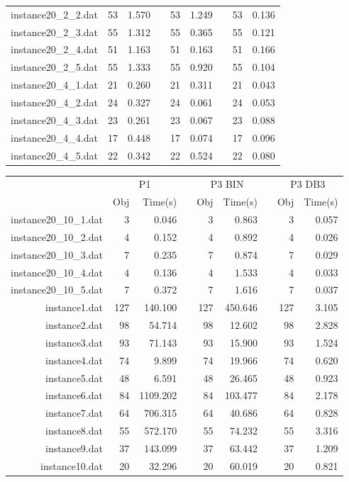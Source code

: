 \begin{table}[h!]
\begin{tabular}{@{}rrrcrrcrr@{}}
instance20\_2\_2.dat & 53 & 1.570 & & 53 & 1.249 & & 53 & 0.136 \\
instance20\_2\_3.dat & 55 & 1.312 & & 55 & 0.365 & & 55 & 0.121 \\
instance20\_2\_4.dat & 51 & 1.163 & & 51 & 0.163 & & 51 & 0.166 \\
instance20\_2\_5.dat & 55 & 1.333 & & 55 & 0.920 & & 55 & 0.104 \\
instance20\_4\_1.dat & 21 & 0.260 & & 21 & 0.311 & & 21 & 0.043 \\
instance20\_4\_2.dat & 24 & 0.327 & & 24 & 0.061 & & 24 & 0.053 \\
instance20\_4\_3.dat & 23 & 0.261 & & 23 & 0.067 & & 23 & 0.088 \\
instance20\_4\_4.dat & 17 & 0.448 & & 17 & 0.074 & & 17 & 0.096 \\
instance20\_4\_5.dat & 22 & 0.342 & & 22 & 0.524 & & 22 & 0.080 \\
\end{tabular}
\end{table}
\newpage
\begin{table}[h!]\centering
{}
\begin{tabular}{@{}rrrcrrcrr@{}}\toprule
& \multicolumn{2}{c}{P1} & \phantom{abc} & \multicolumn{2}{c}{P3 BIN} & \phantom{abc} & \multicolumn{2}{c}{P3 DB3}\\
\cmidrule{2-3} \cmidrule{5-6} \cmidrule{8-9}
& Obj & Time(s) & & Obj & Time(s) & & Obj & Time(s)\\ \midrule
instance20\_10\_1.dat & 3 & 0.046 & & 3 & 0.863 & & 3 & 0.057 \\
instance20\_10\_2.dat & 4 & 0.152 & & 4 & 0.892 & & 4 & 0.026 \\
instance20\_10\_3.dat & 7 & 0.235 & & 7 & 0.874 & & 7 & 0.029 \\
instance20\_10\_4.dat & 4 & 0.136 & & 4 & 1.533 & & 4 & 0.033 \\
instance20\_10\_5.dat & 7 & 0.372 & & 7 & 1.616 & & 7 & 0.037 \\
instance1.dat & 127 & 140.100 & & 127 & 450.646 & & 127 & 3.105 \\
instance2.dat & 98 & 54.714 & & 98 & 12.602 & & 98 & 2.828 \\
instance3.dat & 93 & 71.143 & & 93 & 15.900 & & 93 & 1.524 \\
instance4.dat & 74 & 9.899 & & 74 & 19.966 & & 74 & 0.620 \\
instance5.dat & 48 & 6.591 & & 48 & 26.465 & & 48 & 0.923 \\
instance6.dat & 84 & 1109.202 & & 84 & 103.477 & & 84 & 2.178 \\
instance7.dat & 64 & 706.315 & & 64 & 40.686 & & 64 & 0.828 \\
instance8.dat & 55 & 572.170 & & 55 & 74.232 & & 55 & 3.316 \\
instance9.dat & 37 & 143.099 & & 37 & 63.442 & & 37 & 1.209 \\
instance10.dat & 20 & 32.296 & & 20 & 60.019 & & 20 & 0.821 \\
\bottomrule
\end{tabular}
\end{table}\ \\

